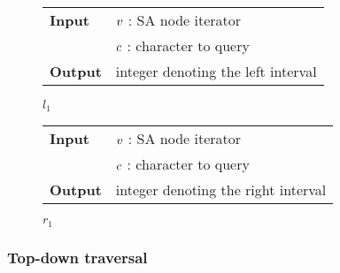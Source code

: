 \begin{figure*}[t!]
\begin{minipage}[t]{.5\textwidth}
\begin{algorithm}[H]
\begin{tabular}{ll}
\textbf{Input}  & $v$ : SA node iterator\\
				& $c$ : character to query\\
\textbf{Output} & integer denoting the left interval\\
\end{tabular}
\begin{algorithmic}[1]
	\Else
	\EndIf
\EndWhile
\State \Return $l_1$
\end{algorithmic}
\label{alg:sa-lower}
\end{algorithm}
\end{minipage}
\hfill
\begin{minipage}[t]{.5\textwidth}
\begin{algorithm}[H]
\begin{tabular}{ll}
\textbf{Input}  & $v$ : SA node iterator\\
				& $c$ : character to query\\
\textbf{Output} & integer denoting the right interval\\
\end{tabular}
\begin{algorithmic}[1]
	\Else
	\EndIf
\EndWhile
\State \Return $r_1$
\end{algorithmic}
\label{alg:sa-upper}
\end{algorithm}
\end{minipage}
\end{figure*}

\subsubsection{Top-down traversal}

